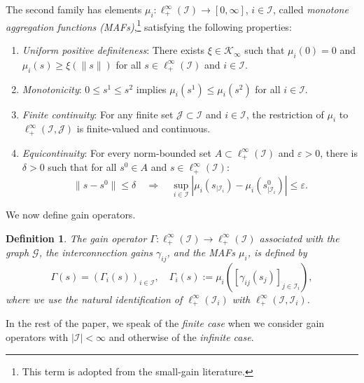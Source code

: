 \documentclass[10pt, oneside, a4paper]{article}
\newcommand{\ep}{\varepsilon}
\newcommand{\GC}{\mathcal{G}}
\newcommand{\IC}{\mathcal{I}}
\newcommand{\JC}{\mathcal{J}}
\newcommand{\KC}{\mathcal{K}}
\newtheorem{definition}{Definition}[section]
\begin{document}
The second family has elements $\mu_i:\ell^{\infty}_+(\IC) \rightarrow [0,\infty]$, $i \in \IC$, called \emph{monotone aggregation functions (MAFs)},\footnote{This term is adopted from the small-gain literature.} satisfying the following properties:%
\begin{enumerate}
\item[(M1)] \emph{Uniform positive definiteness}: There exists $\xi \in \KC_{\infty}$ such that $\mu_i(0) = 0$ and $\mu_i(s) \geq \xi(\|s\|)$ for all $s \in \ell^{\infty}_+(\IC)$ and $i \in \IC$.%
\item[(M2)] \emph{Monotonicity}: $0 \leq s^1 \leq s^2$ implies $\mu_i(s^1) \leq \mu_i(s^2)$ for all $i \in \IC$.%
\item[(M3)] \emph{Finite continuity}: For any finite set $\JC \subset \IC$ and $i \in \IC$, the restriction of $\mu_i$ to $\ell^{\infty}_+(\IC,\JC)$ is finite-valued and continuous.%
\item[(M4)] \emph{Equicontinuity}: For every norm-bounded set $A \subset \ell^{\infty}_+(\IC)$ and $\ep > 0$, there is $\delta > 0$ such that for all $s^0 \in A$ and $s \in \ell^{\infty}_+(\IC)$:%
\begin{equation*}
  \|s - s^0\| \leq \delta \quad \Rightarrow \quad \sup_{i \in \IC}|\mu_i(s_{|\IC_i}) - \mu_i(s^0_{|\IC_i})| \leq \ep.%
\end{equation*}
\end{enumerate}

We now define gain operators.%

\begin{definition}\label{def_normal_gain_op}
The \emph{gain operator} $\Gamma:\ell^{\infty}_+(\IC) \rightarrow \ell^{\infty}_+(\IC)$ associated with the graph $\GC$, the interconnection gains $\gamma_{ij}$, and the MAFs $\mu_i$, is defined by%
\begin{equation*}
  \Gamma(s) = (\Gamma_i(s))_{i \in \IC},\quad \Gamma_i(s) := \mu_i([\gamma_{ij}(s_j)]_{j\in\IC_i}),%
\end{equation*}
where we use the natural identification of $\ell^{\infty}_+(\IC_i)$ with $\ell^{\infty}_+(\IC,\IC_i)$.
\end{definition}

In the rest of the paper, we speak of the \emph{finite case} when we consider gain operators with $|\IC| < \infty$ and otherwise of the \emph{infinite case}.%
\end{document}
